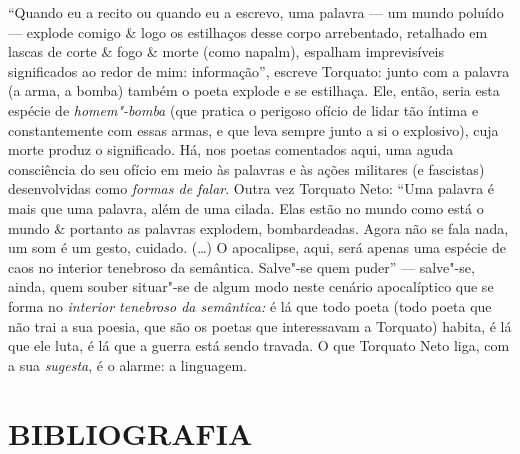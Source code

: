``Quando eu a recito ou quando eu a escrevo, uma palavra --- um mundo
poluído --- explode comigo \& logo os estilhaços desse corpo arrebentado,
retalhado em lascas de corte \& fogo \& morte (como napalm), espalham
imprevisíveis significados ao redor de mim: informação'', escreve
Torquato: junto com a palavra (a arma, a bomba) também o poeta explode e
se estilhaça. Ele, então, seria esta espécie de \emph{homem"-bomba} (que
pratica o perigoso ofício de lidar tão íntima e constantemente com essas
armas, e que leva sempre junto a si o explosivo), cuja morte produz o
significado. Há, nos poetas comentados aqui, uma aguda consciência do
seu ofício em meio às palavras e às ações militares (e fascistas)
desenvolvidas como \emph{formas de falar}. Outra vez Torquato Neto: ``Uma
palavra é mais que uma palavra, além de uma cilada. Elas estão no mundo
como está o mundo \& portanto as palavras explodem, bombardeadas. Agora
não se fala nada, um som é um gesto, cuidado. (\ldots{}) O apocalipse, aqui,
será apenas uma espécie de caos no interior tenebroso da semântica.
Salve"-se quem puder'' --- salve"-se, ainda, quem souber situar"-se de algum
modo neste cenário apocalíptico que se forma no \emph{interior tenebroso
da semântica:} é lá que todo poeta (todo poeta que não trai a sua
poesia, que são os poetas que interessavam a Torquato) habita, é lá que
ele luta, é lá que a guerra está sendo travada. O que Torquato Neto
liga, com a sua \emph{sugesta}, é o alarme: a linguagem.

\pagebreak

\section{BIBLIOGRAFIA}

